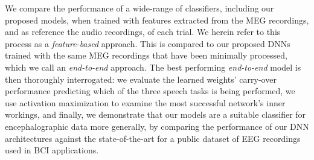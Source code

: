 \documentclass[fleqn,10pt]{wlscirep}
\begin{document}
We compare the performance of a wide-range of classifiers, including our proposed models, when trained with features extracted from the MEG recordings, and as reference the audio recordings, of each trial. We herein refer to this process as a {\em feature-based} approach. This is compared to our proposed DNNs trained with the same MEG recordings that have been minimally processed, which we call an {\em end-to-end} approach. The best performing {\em end-to-end} model is then thoroughly interrogated: we evaluate the learned weights' carry-over performance predicting which of the three speech tasks is being performed, we use activation maximization to examine the most successful network's inner workings, and finally, we demonstrate that our models are a suitable classifier for encephalographic data more generally, by comparing the performance of our DNN architectures against the state-of-the-art for a public dataset of EEG recordings used in BCI applications.


\end{document}
